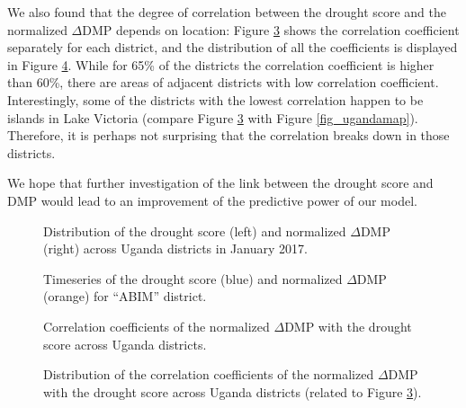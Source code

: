 \documentclass[10pt,parskip=half,
toc=sectionentrywithdots,
bibliography=totocnumbered,
captions=tableheading,numbers=noendperiod]{scrartcl}
\begin{document}
We also found that the degree of correlation between the drought score
and the normalized \(\Delta\)DMP depends on location: Figure
\ref{fig_dmp_corr_districts} shows the correlation coefficient
separately for each district, and the distribution of all the
coefficients is displayed in Figure \ref{fig_dmp_corr_distribution}.
While for 65\% of the districts the correlation coefficient is higher
than 60\%, there are areas of adjacent districts with low correlation
coefficient. Interestingly, some of the districts with the lowest
correlation happen to be islands in Lake Victoria (compare Figure
\ref{fig_dmp_corr_districts} with Figure \ref{fig_ugandamap}).
Therefore, it is perhaps not surprising that the correlation breaks down
in those districts.

We hope that further investigation of the link between the drought score
and DMP would lead to an improvement of the predictive power of our
model.

\begin{figure}[H]\begin{center}\end{center}\caption{Distribution of the drought score (left) and normalized \(\Delta\)DMP
(right) across Uganda districts in January 2017.}\label{fig_dmp_2017}\end{figure}

\begin{figure}[H]\begin{center}\end{center}\caption{Timeseries of the drought score (blue) and normalized \(\Delta\)DMP
(orange) for ``ABIM'' district.}\label{fig_dmp_abim}\end{figure}

\begin{figure}[H]\begin{center}\end{center}\caption{Correlation coefficients of the normalized \(\Delta\)DMP with the
drought score across Uganda districts.}\label{fig_dmp_corr_districts}\end{figure}

\begin{figure}[H]\begin{center}\end{center}\caption{Distribution of the correlation coefficients of the normalized
\(\Delta\)DMP with the drought score across Uganda districts (related to
Figure \ref{fig_dmp_corr_districts}).}\label{fig_dmp_corr_distribution}\end{figure}
\end{document}
